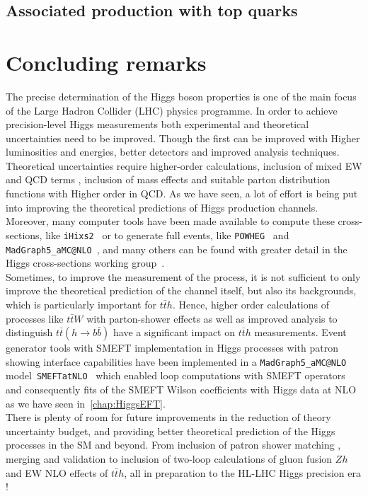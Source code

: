 \subsection{Associated production with top quarks}


\section{Concluding remarks \label{sec:singlehiggsconc}  }
The precise determination of the Higgs boson properties is one of the main focus of the Large Hadron Collider (LHC) physics programme. In order to achieve precision-level Higgs measurements both experimental and theoretical uncertainties need to be improved. Though the first can be improved with Higher luminosities and energies, better detectors and improved analysis techniques. Theoretical uncertainties require higher-order calculations, inclusion of mixed EW and QCD terms , inclusion of mass effects and suitable parton distribution functions with Higher order in QCD.  As we have seen, a lot of effort is being put into improving the theoretical predictions of Higgs production channels. Moreover, many computer tools have been made available to compute these cross-sections, like \texttt{iHixs2}~\cite{Dulat:2018rbf} or to generate full events, like \texttt{POWHEG}~\cite{Alioli:2008tz,Nason:2009ai,Bagnaschi:2011tu,Campbell:2012am,Luisoni:2013cuh,Jager:2014vna,Hartanto:2015uka} and \texttt{MadGraph5\_aMC@NLO}~\cite{Alwall:2014hca}, and many others can be found with greater detail in the Higgs cross-sections working group~\cite{HXSWG}.  \\ Sometimes, to improve the measurement of the process, it is not sufficient to only improve the theoretical prediction of the channel itself, but also its backgrounds, which is particularly important for $t\bar th $. Hence, higher order calculations of processes like $t\bar t W$ with parton-shower effects as well as improved analysis to distinguish $t\bar t(h \to b \bar b) $ have a significant impact on  $t\bar th $ measurements.
Event generator tools with SMEFT implementation in Higgs processes with patron showing interface capabilities  have been implemented in a \texttt{MadGraph5\_aMC@NLO} model~\texttt{SMEFTatNLO}~\cite{Degrande:2020evl} which enabled loop computations with SMEFT operators and consequently fits of the SMEFT Wilson coefficients with Higgs data at NLO as we have seen in~\autoref{chap:HiggsEFT}.\\
There is plenty of room for future improvements in the reduction of theory uncertainty budget, and providing better theoretical prediction of the Higgs processes in the SM and beyond. From inclusion of patron shower matching , merging and validation to  inclusion of two-loop calculations of gluon fusion $Zh$  and EW NLO effects of  $t\bar th $, all in preparation to the HL-LHC Higgs precision era ! 

